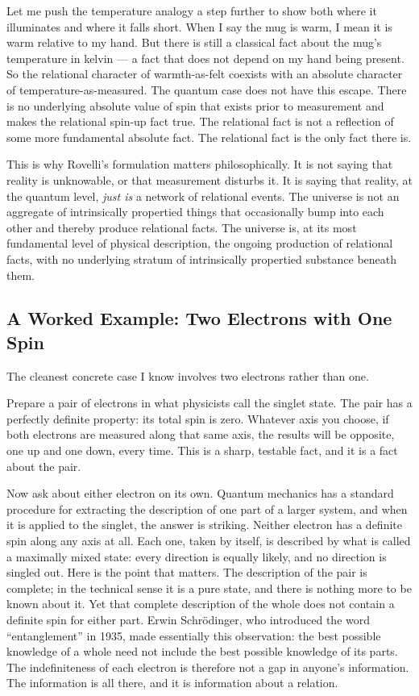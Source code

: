 Let me push the temperature analogy a step further to show both where it illuminates and where it falls short. When I say the mug is warm, I mean it is warm relative to my hand. But there is still a classical fact about the mug's temperature in kelvin --- a fact that does not depend on my hand being present. So the relational character of warmth-as-felt coexists with an absolute character of temperature-as-measured. The quantum case does not have this escape. There is no underlying absolute value of spin that exists prior to measurement and makes the relational spin-up fact true. The relational fact is not a reflection of some more fundamental absolute fact. The relational fact is the only fact there is.

This is why Rovelli's formulation matters philosophically. It is not saying that reality is unknowable, or that measurement disturbs it. It is saying that reality, at the quantum level, \emph{just is} a network of relational events. The universe is not an aggregate of intrinsically propertied things that occasionally bump into each other and thereby produce relational facts. The universe is, at its most fundamental level of physical description, the ongoing production of relational facts, with no underlying stratum of intrinsically propertied substance beneath them.

\subsection*{A Worked Example: Two Electrons with One Spin}

The cleanest concrete case I know involves two electrons rather than one.

Prepare a pair of electrons in what physicists call the singlet state. The pair has a perfectly definite property: its total spin is zero. Whatever axis you choose, if both electrons are measured along that same axis, the results will be opposite, one up and one down, every time. This is a sharp, testable fact, and it is a fact about the pair.

Now ask about either electron on its own. Quantum mechanics has a standard procedure for extracting the description of one part of a larger system, and when it is applied to the singlet, the answer is striking. Neither electron has a definite spin along any axis at all. Each one, taken by itself, is described by what is called a maximally mixed state: every direction is equally likely, and no direction is singled out. Here is the point that matters. The description of the pair is complete; in the technical sense it is a pure state, and there is nothing more to be known about it. Yet that complete description of the whole does not contain a definite spin for either part. Erwin Schrödinger, who introduced the word ``entanglement'' in 1935, made essentially this observation: the best possible knowledge of a whole need not include the best possible knowledge of its parts. The indefiniteness of each electron is therefore not a gap in anyone's information. The information is all there, and it is information about a relation.

